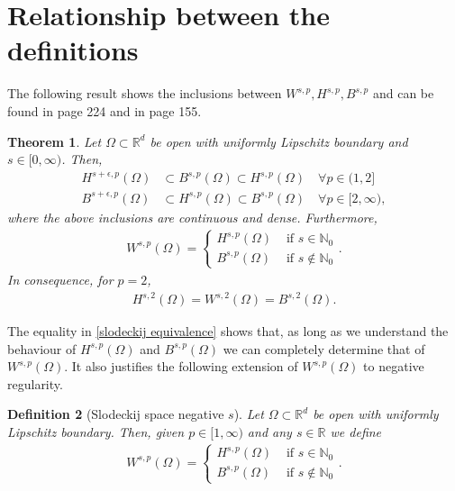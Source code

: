 \documentclass[
    a4paper,
    DIV=14,
    abstract=true,
    numbers=noenddot
]
{scrartcl}
\newtheorem{theorem}{Theorem}[section]
\newtheorem{definition}[theorem]{Definition}
\theoremstyle{definition}
\newcommand{\N}{\mathbb{N}}
\newcommand{\R}{\mathbb{R}}
\begin{document}
\section{Relationship between the definitions}
The following result shows the inclusions between $W^{s,p},H^{s,p},B^{s,p}$ and can be found in \cite{agranovich2015sobolev} page 224 and in \cite{stein1970singular} page 155.
\begin{theorem}\label{equivalence fractional spaces}
  Let $\Omega \subset \R^d$ be open with uniformly Lipschitz boundary and $s \in [0,\infty)$. Then,
  \begin{align*}
    H^{s+\epsilon,p}(\Omega ) & \subset B^{s,p}(\Omega )  \subset H^{s,p}(\Omega )\quad \forall p \in (1,2]       \\
    B^{s+\epsilon,p}(\Omega ) & \subset H^{s,p}(\Omega )  \subset B^{s,p}(\Omega )\quad \forall p \in [2,\infty),
  \end{align*}
  where the above inclusions are continuous and dense. Furthermore,
  \begin{align}\label{slodeckij equivalence}
    W^{s,p}(\Omega )= \begin{cases}
                        H^{s,p}(\Omega ) & \text{ if } s \in \N_0    \\
                        B^{s,p}(\Omega ) & \text{ if } s \notin \N_0
                      \end{cases}.
  \end{align}
  In consequence, for $p=2$,
  \begin{align}\label{p=2}
    H^{s,2}(\Omega )=W^{s,2}(\Omega )=B^{s,2}(\Omega ).
  \end{align}
\end{theorem}
The equality in \eqref{slodeckij equivalence} shows that, as long as we understand the behaviour of $H^{s,p}(\Omega )$ and $B^{s,p}(\Omega )$ we can completely determine that of $W^{s,p}(\Omega )$. It also justifies the following extension of $W^{s,p}(\Omega )$ to negative regularity.
\begin{definition}[Slodeckij space negative $s$]\label{negative s slodeckij}
  Let $\Omega \subset \R^d$ be open with uniformly Lipschitz boundary. Then, given $p \in [1,\infty)$ and any  $s \in \R$ we define
  \begin{align*}
    W^{s,p}(\Omega )= \begin{cases}
                        H^{s,p}(\Omega ) & \text{ if } s \in \N_0    \\
                        B^{s,p}(\Omega ) & \text{ if } s \notin \N_0
                      \end{cases}.
  \end{align*}
\end{definition}
\end{document}
